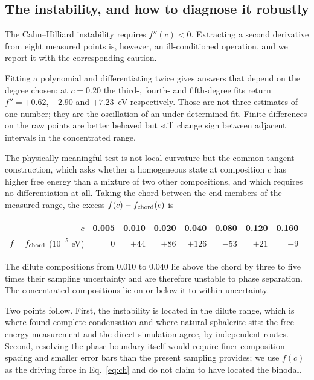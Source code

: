 \documentclass[11pt,a4paper]{article}
\begin{document}
\subsection{The instability, and how to diagnose it robustly}
\label{sec:spinodal}

The Cahn--Hilliard instability requires $f''(c) < 0$. Extracting a second
derivative from eight measured points is, however, an ill-conditioned operation,
and we report it with the corresponding caution.

Fitting a polynomial and differentiating twice gives answers that depend on the
degree chosen: at $c = 0.20$ the third-, fourth- and fifth-degree fits return
$f'' = +0.62$, $-2.90$ and $+7.23$~eV respectively. Those are not three
estimates of one number; they are the oscillation of an under-determined fit.
Finite differences on the raw points are better behaved but still change sign
between adjacent intervals in the concentrated range.

The physically meaningful test is not local curvature but the common-tangent
construction, which asks whether a homogeneous state at composition $c$ has
higher free energy than a mixture of two other compositions, and which requires
no differentiation at all. Taking the chord between the end members of the
measured range, the excess $f(c) - f_{\rm chord}(c)$ is
\begin{center}
\small
\begin{tabular}{rrrrrrrr}
\toprule
$c$ & 0.005 & 0.010 & 0.020 & 0.040 & 0.080 & 0.120 & 0.160 \\
\midrule
$f - f_{\rm chord}$ ($10^{-5}$ eV) & $0$ & $+44$ & $+86$ & $+126$ & $-53$ & $+21$ & $-9$ \\
\bottomrule
\end{tabular}
\end{center}
The dilute compositions from 0.010 to 0.040 lie above the chord by three to
five times their sampling uncertainty and are therefore unstable to phase
separation. The concentrated compositions lie on or below it to within
uncertainty.

Two points follow. First, the instability is located in the dilute range,
which is where \citet{yu2026b} found complete condensation and where natural
sphalerite sits: the free-energy measurement and the direct simulation agree,
by independent routes. Second, resolving the phase boundary itself would require
finer composition spacing and smaller error bars than the present sampling
provides; we use $f(c)$ as the driving force in Eq.~\eqref{eq:ch} and do not
claim to have located the binodal.
\end{document}
